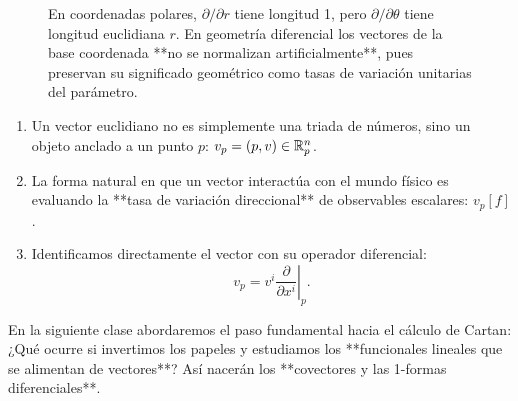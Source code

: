 \documentclass[11pt,letterpaper]{article}
\begin{document}
\begin{figure}[htbp]
\centering
{}
\caption{En coordenadas polares, $\partial/\partial r$ tiene longitud 1, pero $\partial/\partial \theta$ tiene longitud euclidiana $r$. En geometría diferencial los vectores de la base coordenada **no se normalizan artificialmente**, pues preservan su significado geométrico como tasas de variación unitarias del parámetro.}
\label{fig:polar_basis}
\end{figure}


\begin{enumerate}
    \item Un vector euclidiano no es simplemente una triada de números, sino un objeto anclado a un punto $p$: $v_p = (p, v) \in \mathbb{R}^n_p$.
    \item La forma natural en que un vector interactúa con el mundo físico es evaluando la **tasa de variación direccional** de observables escalares: $v_p[f]$.
    \item Identificamos directamente el vector con su operador diferencial:
    \[
    v_p = v^i \left.\frac{\partial}{\partial x^i}\right|_p.
    \]
\end{enumerate}

En la siguiente clase abordaremos el paso fundamental hacia el cálculo de Cartan: ¿Qué ocurre si invertimos los papeles y estudiamos los **funcionales lineales que se alimentan de vectores**? Así nacerán los **covectores y las 1-formas diferenciales**.
\end{document}

